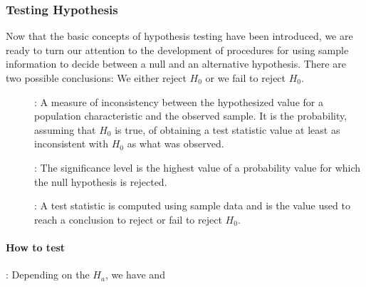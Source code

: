 \subsubsection{Testing Hypothesis}
Now that the basic concepts of hypothesis testing have been introduced, we are ready
to turn our attention to the development of procedures for using sample information
to decide between a null and an alternative hypothesis. There are two possible conclusions: We either reject \(H_0\) or we fail to reject \(H_0\).
\\
\begin{description}
    \item[]: A measure of inconsistency between the hypothesized value for a population characteristic and the observed sample. It is the probability, assuming that \(H_0\) is true,
of obtaining a test statistic value at least as inconsistent with \(H_0\) as what was
observed.
    \item[]: The significance level is the highest value of a probability value for which the null hypothesis is rejected.
    \item[]: A test statistic is computed using sample data and is the value used to reach a
conclusion to reject or fail to reject \(H_0\).
\end{description}

\paragraph{How to test}: Depending on the \(H_a\), we have  and 

